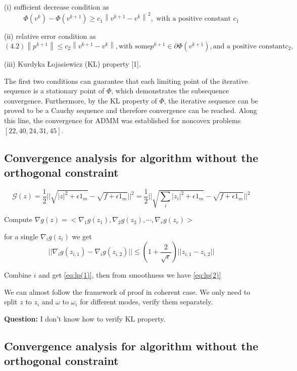 \documentclass{article}
\numberwithin{equation}{section}
\begin{document}
(i) sufficient decrease condition as
\begin{equation}
\Phi\left(v^{k}\right)-\Phi\left(v^{k+1}\right) \geq c_{1}\left\|v^{k+1}-v^{k}\right\|^{2}, \text { with a positive constant } c_{1}
\label{eq:sufficient decrease}
\end{equation}



(ii) relative error condition as
\begin{equation}
(4.2) \left\|p^{k+1}\right\| \leq c_{2}\left\|v^{k+1}-v^{k}\right\|, \text{with some} p^{k+1} \in \partial \Phi\left(v^{k+1}\right), \text{and a positive constant} c_{2},
\label{eq:relative error}
\end{equation}


(iii) Kurdyka Łojasiewicz (KL) property [1].

The first two conditions can guarantee that each limiting point of the iterative sequence is a stationary point of $\Phi$, which demonstrates the subsequence convergence. Furthermore, by the KL property of $\Phi$, the iterative sequence can be proved to be a Cauchy sequence and therefore convergence can be reached. Along this line, the convergence for ADMM was established for noncovex problems $[22,40,24,31,45]$.

\subsection{Convergence analysis for algorithm without the orthogonal constraint}

$$
 \mathcal{G}(z) = \frac{1}{2} || \sqrt{|z|^2 + \epsilon 1_m}  -  \sqrt{f + \epsilon 1_m}||^2
 =  \frac{1}{2} || \sqrt{\sum_i|z_i|^2 + \epsilon 1_m}  -  \sqrt{f + \epsilon 1_m}||^2
$$

Compute $\nabla g(z) = <\nabla_1 g(z_1),\nabla_2 g(z_2),\cdots,\nabla_r g(z_r)>$

for a single $\nabla_i g(z_i)$ we get 
$$
||\nabla_i g(z_{i,1}) - \nabla_i g(z_{i,2})|| \leq (1 + \frac{2}{\sqrt{\epsilon}}) ||z_{i,1} - z_{i,2}|| 
$$

Combine $i$ and get \eqref{eq:lp(1)}, then from smoothness we have \eqref{eq:lp(2)}

We can almost follow the framework of proof in coherent case. We only need to split $z$ to $z_i$ and $\omega$ to $\omega_i$ for different modes, verify them separately.

\textbf{Question:} I don't know how to verify KL property.  

\subsection{Convergence analysis for algorithm without the orthogonal constraint}
\end{document}
